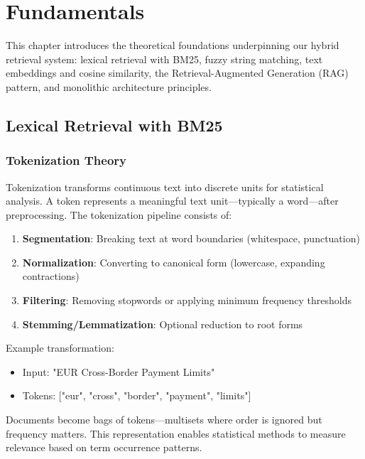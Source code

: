 \chapter{Fundamentals}
\label{ch:fundamentals}

This chapter introduces the theoretical foundations underpinning our hybrid retrieval system: lexical retrieval with BM25, fuzzy string matching, text embeddings and cosine similarity, the Retrieval-Augmented Generation (RAG) pattern, and monolithic architecture principles.

\section{Lexical Retrieval with BM25}

\subsection{Tokenization Theory}

Tokenization transforms continuous text into discrete units for statistical analysis. A token represents a meaningful text unit—typically a word—after preprocessing. The tokenization pipeline consists of:

\begin{enumerate}[leftmargin=*,itemsep=2pt,topsep=2pt]
\item \textbf{Segmentation}: Breaking text at word boundaries (whitespace, punctuation)
\item \textbf{Normalization}: Converting to canonical form (lowercase, expanding contractions)
\item \textbf{Filtering}: Removing stopwords or applying minimum frequency thresholds
\item \textbf{Stemming/Lemmatization}: Optional reduction to root forms
\end{enumerate}

Example transformation:
\begin{itemize}[leftmargin=*,itemsep=2pt,topsep=2pt]
\item Input: "EUR Cross-Border Payment Limits"
\item Tokens: ["eur", "cross", "border", "payment", "limits"]
\end{itemize}

Documents become bags of tokens—multisets where order is ignored but frequency matters. This representation enables statistical methods to measure relevance based on term occurrence patterns.

